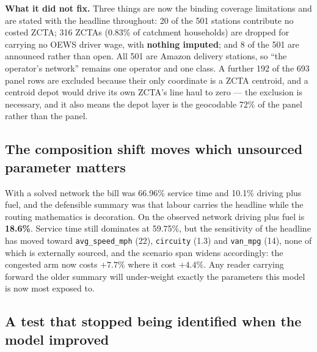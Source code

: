 \documentclass[conference]{IEEEtran}
\begin{document}
\textbf{What it did not fix.} Three things are now the binding coverage
limitations and are stated with the headline throughout: 20 of the 501 stations
contribute no costed ZCTA; 316 ZCTAs (0.83\% of catchment households) are
dropped for carrying no OEWS driver wage, with \textbf{nothing imputed}; and
8 of the 501 are announced rather than open. All 501 are Amazon delivery
stations, so ``the operator's network'' remains one operator and one class.
A further 192 of the 693 panel rows are excluded because their only coordinate
is a ZCTA centroid, and a centroid depot would drive its own ZCTA's line haul
to zero --- the exclusion is necessary, and it also means the depot layer is
the geocodable 72\% of the panel rather than the panel.

\subsection{The composition shift moves which unsourced parameter matters}

With a solved network the bill was 66.96\% service time and 10.1\% driving
plus fuel, and the defensible summary was that labour carries the headline
while the routing mathematics is decoration. On the observed network driving
plus fuel is \textbf{18.6\%}. Service time still dominates at 59.75\%, but the
sensitivity of the headline has moved toward \texttt{avg\_speed\_mph} (22),
\texttt{circuity} (1.3) and \texttt{van\_mpg} (14), none of which is
externally sourced, and the scenario span widens accordingly: the congested
arm now costs $+7.7\%$ where it cost $+4.4\%$. Any reader carrying forward the
older summary will under-weight exactly the parameters this model is now most
exposed to.

\subsection{A test that stopped being identified when the model improved}
\end{document}
